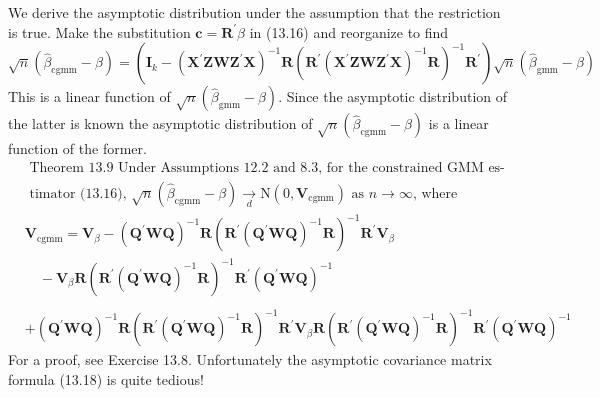 \documentclass[10pt]{article}
\begin{document}
We derive the asymptotic distribution under the assumption that the restriction is true. Make the substitution $\boldsymbol{c}=\boldsymbol{R}^{\prime} \beta$ in (13.16) and reorganize to find
$$
\sqrt{n}\left(\widehat{\beta}_{\mathrm{cgmm}}-\beta\right)=\left(\boldsymbol{I}_{k}-\left(\boldsymbol{X}^{\prime} \boldsymbol{Z} \boldsymbol{W} \boldsymbol{Z}^{\prime} \boldsymbol{X}\right)^{-1} \boldsymbol{R}\left(\boldsymbol{R}^{\prime}\left(\boldsymbol{X}^{\prime} \boldsymbol{Z} \boldsymbol{W} \boldsymbol{Z}^{\prime} \boldsymbol{X}\right)^{-1} \boldsymbol{R}\right)^{-1} \boldsymbol{R}^{\prime}\right) \sqrt{n}\left(\widehat{\beta}_{\mathrm{gmm}}-\beta\right)
$$
This is a linear function of $\sqrt{n}\left(\widehat{\beta}_{\mathrm{gmm}}-\beta\right)$. Since the asymptotic distribution of the latter is known the asymptotic distribution of $\sqrt{n}\left(\widehat{\beta}_{\mathrm{cgmm}}-\beta\right)$ is a linear function of the former.
$$
\begin{aligned}
&\text { Theorem 13.9 Under Assumptions } 12.2 \text { and 8.3, for the constrained GMM es- } \\
&\text { timator (13.16), } \sqrt{n}\left(\widehat{\beta}_{\mathrm{cgmm}}-\beta\right) \underset{d}{\longrightarrow} \mathrm{N}\left(0, \boldsymbol{V}_{\mathrm{cgmm}}\right) \text { as } n \rightarrow \infty \text {, where } \\
&\boldsymbol{V}_{\mathrm{cgmm}}=\boldsymbol{V}_{\beta}-\left(\boldsymbol{Q}^{\prime} \boldsymbol{W} \boldsymbol{Q}\right)^{-1} \boldsymbol{R}\left(\boldsymbol{R}^{\prime}\left(\boldsymbol{Q}^{\prime} \boldsymbol{W} \boldsymbol{Q}\right)^{-1} \boldsymbol{R}\right)^{-1} \boldsymbol{R}^{\prime} \boldsymbol{V}_{\beta} \\
&\quad-\boldsymbol{V}_{\beta} \boldsymbol{R}\left(\boldsymbol{R}^{\prime}\left(\boldsymbol{Q}^{\prime} \boldsymbol{W} \boldsymbol{Q}\right)^{-1} \boldsymbol{R}\right)^{-1} \boldsymbol{R}^{\prime}\left(\boldsymbol{Q}^{\prime} \boldsymbol{W} \boldsymbol{Q}\right)^{-1} \\
& \\
&+\left(\boldsymbol{Q}^{\prime} \boldsymbol{W} \boldsymbol{Q}\right)^{-1} \boldsymbol{R}\left(\boldsymbol{R}^{\prime}\left(\boldsymbol{Q}^{\prime} \boldsymbol{W} \boldsymbol{Q}\right)^{-1} \boldsymbol{R}\right)^{-1} \boldsymbol{R}^{\prime} \boldsymbol{V}_{\beta} \boldsymbol{R}\left(\boldsymbol{R}^{\prime}\left(\boldsymbol{Q}^{\prime} \boldsymbol{W} \boldsymbol{Q}\right)^{-1} \boldsymbol{R}\right)^{-1} \boldsymbol{R}^{\prime}\left(\boldsymbol{Q}^{\prime} \boldsymbol{W} \boldsymbol{Q}\right)^{-1}
\end{aligned}
$$
For a proof, see Exercise 13.8. Unfortunately the asymptotic covariance matrix formula (13.18) is quite tedious!
\end{document}
